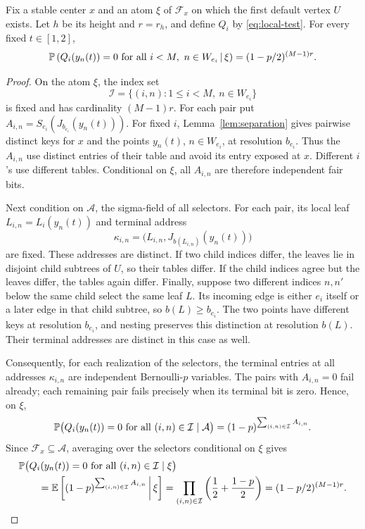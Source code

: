 \begin{lemma}
 \label{lem:independent-tests}
Fix a stable center \(x\) and an atom \(\xi\) of \(\mathcal F_x\)
on which the first default vertex \(U\) exists. Let \(h\) be its
height and \(r=r_h\), and define \(Q_i\) by \eqref{eq:local-test}.
For every fixed \(t\in[1,2]\),
\begin{equation}
 \label{eq:test-failure}
 \mathbb P\left(
 Q_i(y_n(t))=0\text{ for all }i<M,\ n\in W_{e_i}
 \,\middle|\,\xi\right)
 =(1-p/2)^{(M-1)r}.
\end{equation}
\end{lemma}

\begin{proof}
On the atom \(\xi\), the index set
\[
 \mathcal I=\{(i,n):1\le i<M,\ n\in W_{e_i}\}
\]
is fixed and has cardinality \((M-1)r\). For each pair put
\(A_{i,n}=S_{e_i}(J_{b_{e_i}}(y_n(t)))\).
For fixed \(i\), Lemma~\ref{lem:separation} gives pairwise distinct
keys for \(x\) and the points \(y_n(t)\), \(n\in W_{e_i}\), at
resolution \(b_{e_i}\). Thus the \(A_{i,n}\) use distinct entries of
their table and avoid its entry exposed at \(x\). Different \(i\)'s
use different tables. Conditional on \(\xi\), all \(A_{i,n}\) are
therefore independent fair bits.

Next condition on \(\mathcal A\), the sigma-field of all selectors.
For each pair, its local leaf \(L_{i,n}=L_i(y_n(t))\) and terminal
address
\[
 \kappa_{i,n}
 =\bigl(L_{i,n},J_{b(L_{i,n})}(y_n(t))\bigr)
\]
are fixed. These addresses are distinct. If two child indices differ,
the leaves lie in disjoint child subtrees of \(U\), so their tables
differ. If the child indices agree but the leaves differ, the tables
again differ. Finally, suppose two different indices \(n,n'\) below
the same child select the same leaf \(L\). Its incoming edge is either
\(e_i\) itself or a later edge in that child subtree, so
\(b(L)\ge b_{e_i}\). The two points have different keys at resolution
\(b_{e_i}\), and nesting preserves this distinction at resolution
\(b(L)\). Their terminal addresses are distinct in this case as well.

Consequently, for each realization of the selectors, the terminal
entries at all addresses \(\kappa_{i,n}\) are independent
Bernoulli-\(p\) variables. The pairs with \(A_{i,n}=0\) fail already;
each remaining pair fails precisely when its terminal bit is zero.
Hence, on \(\xi\),
\[
 \mathbb P\bigl(Q_i(y_n(t))=0\text{ for all }(i,n)\in\mathcal I
       \mid\mathcal A\bigr)
 =(1-p)^{\sum_{(i,n)\in\mathcal I}A_{i,n}}.
\]
Since \(\mathcal F_x\subseteq\mathcal A\), averaging over the
selectors conditional on \(\xi\) gives
\begin{align*}
 &\mathbb P\bigl(Q_i(y_n(t))=0\text{ for all }(i,n)\in\mathcal I
       \mid\xi\bigr)\\
 &\qquad=\mathbb E\left[(1-p)^{\sum_{(i,n)\in\mathcal I}A_{i,n}}
       \,\middle|\,\xi\right]
 =\prod_{(i,n)\in\mathcal I}\left(\frac12+\frac{1-p}{2}\right)
 =(1-p/2)^{(M-1)r}.
\end{align*}
\end{proof}

